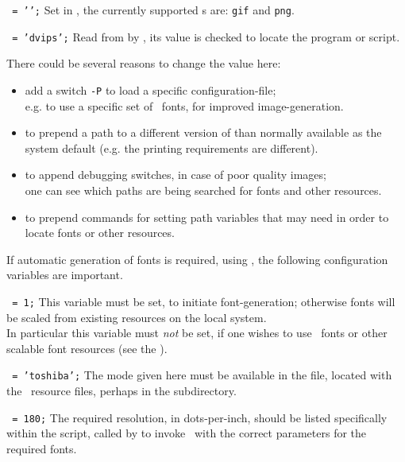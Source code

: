 \begin{htmllist}
\item [\fn{\$IMAGE\_TYPE}\texttt{ = '\Meta{image-type}';}]
Set in , the currently supported s
are: \texttt{gif} and \texttt{png}.

\item [\fn{\$DVIPS}\texttt{ = 'dvips';}]
Read from  by ,
its value is checked to locate the  program or script.

\smallskip\noindent
There could be several reasons to change the value here:
\begin{itemize}
\item
add a switch \texttt{-P} to load a specific configuration-file;\\
e.g. to use a specific set of \PS\ fonts, for improved image-generation.
\item
to prepend a path to a different version of  than normally
available as the system default (e.g. the printing requirements are different).
\item
to append debugging switches, in case of poor quality images;\\
one can see which paths are being searched for fonts and other resources.
\item
to prepend commands for setting path variables that  may need
in order to locate fonts or other resources.
\end{itemize}

If automatic generation of fonts is required, using \MF, the following
configuration variables are important.
%
\begin{htmllist}%
%
\item [\fn{\$PK\_GENERATION}\texttt{ = 1;}\label{pkgen}]
This variable must be set, to initiate font-generation; otherwise fonts
will be scaled from existing resources on the local system.\\
In particular this variable must \emph{not} be set, if one wishes to use
\PS\ fonts or other scalable font resources
(see the  ).

\item [\fn{\$DVIPS\_MODE}\texttt{ = 'toshiba';}]
The mode given here must be available in the  file,
located with the \MF\ resource files, perhaps in the  subdirectory.

\item [\fn{\$METAFONT\_DPI}\texttt{ = 180;}]
The required resolution, in dots-per-inch, should be listed specifically
within the  script, called by  to invoke \MF\ with
the correct parameters for the required fonts.
%
\end{htmllist}



\end{htmllist}
